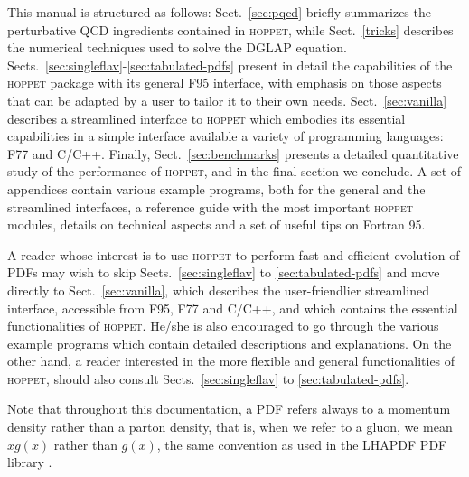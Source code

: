 \documentclass[12pt]{article}
\newcommand{\hoppet}{\textsc{hoppet}\xspace}
\begin{document}
This manual is structured as follows: Sect.~\ref{sec:pqcd}
briefly summarizes the perturbative QCD ingredients contained in
\hoppet, while Sect.~\ref{tricks} describes the numerical techniques
used to solve the DGLAP equation. 
Sects.~\ref{sec:singleflav}-\ref{sec:tabulated-pdfs} present in detail the capabilities
of the \hoppet package with its general F95 interface, 
with emphasis on those aspects that
can be adapted by a user to tailor it to their own needs. 
Sect.~\ref{sec:vanilla} describes a streamlined interface
to \hoppet which embodies its essential capabilities in
a simple interface available a variety of programming languages: 
F77 and C/C++.
Finally, Sect.~\ref{sec:benchmarks} presents a detailed 
quantitative study of
the performance of \hoppet, and in the final section we conclude.
A set of appendices contain various example programs,
both for the general and the streamlined interfaces, a reference
guide with the most important \hoppet modules,
details on technical aspects and a set of useful tips on
Fortran 95. 


A reader 
whose interest is to use \hoppet to perform
fast and efficient evolution of PDFs 
may wish to skip 
Sects.~\ref{sec:singleflav} to \ref{sec:tabulated-pdfs}
and move directly to
 Sect.~\ref{sec:vanilla}, which describes the 
user-friendlier streamlined interface,
accessible from F95, F77 and C/C++, and which contains the essential
functionalities of \hoppet. He/she is also encouraged to go through the
various example programs which contain detailed 
descriptions and explanations. 
On the other hand, a reader interested in the
more flexible and general 
functionalities of \hoppet, should also consult
Sects.~\ref{sec:singleflav} to \ref{sec:tabulated-pdfs}. 

Note 
that throughout this documentation, a PDF refers always to a momentum
density rather than a parton density, that is, when we refer to
a gluon, we mean $xg(x)$ rather than $g(x)$, the same convention
as used in the LHAPDF PDF library \cite{LHAPDF}.


\end{document}
